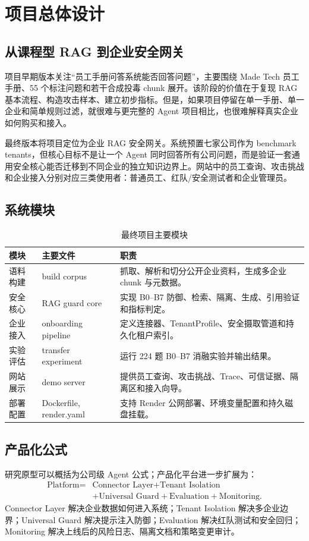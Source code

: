 \documentclass[UTF8,a4paper,zihao=-4]{ctexart}
\begin{document}
\section{项目总体设计}
\subsection{从课程型 RAG 到企业安全网关}
项目早期版本关注“员工手册问答系统能否回答问题”，主要围绕 Made Tech 员工手册、55 个标注问题和若干合成投毒 chunk 展开。该阶段的价值在于复现 RAG 基本流程、构造攻击样本、建立初步指标。但是，如果项目停留在单一手册、单一企业和简单规则过滤，就很难与更完整的 Agent 项目相比，也很难解释真实企业如何购买和接入。

最终版本将项目定位为企业 RAG 安全网关。系统预置七家公司作为 benchmark tenants，但核心目标不是让一个 Agent 同时回答所有公司问题，而是验证一套通用安全核心能否迁移到不同企业的独立知识边界上。网站中的员工查询、攻击挑战和企业接入分别对应三类使用者：普通员工、红队/安全测试者和企业管理员。

\subsection{系统模块}
\begin{table}[H]
\centering
\caption{最终项目主要模块}
\small
\begin{tabularx}{\textwidth}{L{2.6cm}L{3.8cm}Y}
\toprule
模块 & 主要文件 & 职责 \\
\midrule
语料构建 & build corpus & 抓取、解析和切分公开企业资料，生成多企业 chunk 与元数据。\\
安全核心 & RAG guard core & 实现 B0--B7 防御、检索、隔离、生成、引用验证和指标判定。\\
企业接入 & onboarding pipeline & 定义连接器、TenantProfile、安全摄取管道和持久化租户索引。\\
实验评估 & transfer experiment & 运行 224 题 B0--B7 消融实验并输出结果。\\
网站展示 & demo server & 提供员工查询、攻击挑战、Trace、可信证据、隔离区和接入向导。\\
部署配置 & Dockerfile, render.yaml & 支持 Render 公网部署、环境变量配置和持久磁盘挂载。\\
\bottomrule
\end{tabularx}
\end{table}

\subsection{产品化公式}
研究原型可以概括为公司级 Agent 公式；产品化平台进一步扩展为：
\begin{equation}
\begin{aligned}
\text{Platform}={}&\text{Connector Layer}+\text{Tenant Isolation}\\
&+\text{Universal Guard}+\text{Evaluation}+\text{Monitoring}.
\end{aligned}
\end{equation}
Connector Layer 解决企业数据如何进入系统；Tenant Isolation 解决多企业边界；Universal Guard 解决提示注入防御；Evaluation 解决红队测试和安全回归；Monitoring 解决上线后的风险日志、隔离文档和策略变更审计。
\end{document}
